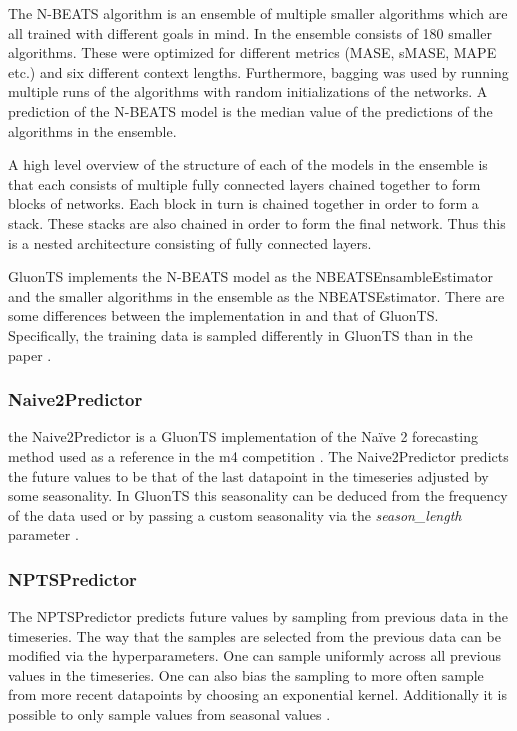The N-BEATS algorithm is an ensemble of multiple smaller algorithms which are all trained with different goals in mind. In \cite{oreshkin_n-beats_2020} the ensemble consists of 180 smaller algorithms. These were optimized for different metrics (MASE, sMASE, MAPE etc.) and six different context lengths. Furthermore, bagging was used by running multiple runs of the algorithms with random initializations of the networks. A prediction of the N-BEATS model is the median value of the predictions of the algorithms in the ensemble. 

A high level overview of the structure of each of the models in the ensemble is that each consists of multiple fully connected layers chained together to form blocks of networks. Each block in turn is chained together in order to form a stack. These stacks are also chained in order to form the final network. Thus this is a nested architecture consisting of fully connected layers.

GluonTS implements the N-BEATS model as the NBEATSEnsambleEstimator and the smaller algorithms in the ensemble as the NBEATSEstimator. There are some differences between the implementation in \cite{oreshkin_n-beats_2020} and that of GluonTS. Specifically, the training data is sampled differently in GluonTS than in the paper \cite{gluonts-website}. 

\subsubsection{Naive2Predictor}
the Naive2Predictor is a GluonTS implementation of the Naïve 2 forecasting method used as a reference in the m4 competition \cite{makridakis_m4_2020}. The Naive2Predictor predicts the future values to be that of the last datapoint in the timeseries adjusted by some seasonality. In GluonTS this seasonality can be deduced from the frequency of the data used or by passing a custom seasonality via the \textit{season\_length} parameter \cite{gluonts-website}. 

\subsubsection{NPTSPredictor}
The NPTSPredictor predicts future values by sampling from previous data in the timeseries. The way that the samples are selected from the previous data can be modified via the hyperparameters. One can sample uniformly across all previous values in the timeseries. One can also bias the sampling to more often sample from more recent datapoints by choosing an exponential kernel. Additionally it is possible to only sample values from seasonal values \cite{gluonts-website}.

